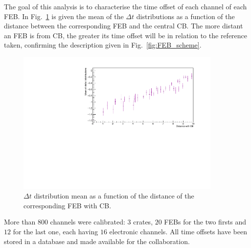 The goal of this analysis is to characterise the time offset of each channel of each FEB.
In Fig.~\ref{fig:mean_distance} is given the mean of the $\Delta t$ distributions as a function of the distance between the corresponding FEB and the central CB.
The more distant an FEB is from CB, the greater its time offset will be in relation to the reference taken, confirming the description given in Fig.~\ref{fig:FEB_scheme}.
\begin{figure}[h!]
  \centering
  \includegraphics[width=0.9\textwidth]{commissioning/fig_commissioning/mean_distance.pdf}
  \caption{$\Delta t$ distribution mean as a function of the distance of the corresponding FEB with CB.
    \label{fig:mean_distance}}
\end{figure}

More than $800$ channels were calibrated: $3$ crates, $20$ FEBs for the two firsts and $12$ for the last one, each having $16$ electronic channels.
All time offsets have been stored in a database and made available for the collaboration.






